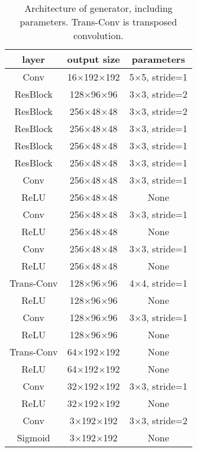 \documentclass{article}
\begin{document}
\begin{table}[h] 
  \centering  
    \begin{tabular}{c|c|c}  
    \hline
    \textbf{layer} & \textbf{output size} & \textbf{parameters}\\ 
    \hline \hline
      Conv & 16$\times$192$\times$192 & 5$\times$5, stride=1 \\
    \hline
      ResBlock & 128$\times$96$\times$96 & 3$\times$3, stride=2 \\
    \hline
      ResBlock & 256$\times$48$\times$48 & 3$\times$3, stride=2 \\
    \hline
      ResBlock & 256$\times$48$\times$48 & 3$\times$3, stride=1 \\
    \hline
      ResBlock & 256$\times$48$\times$48 & 3$\times$3, stride=1 \\
    \hline
      ResBlock & 256$\times$48$\times$48 & 3$\times$3, stride=1 \\
    \hline
      Conv & 256$\times$48$\times$48 & 3$\times$3, stride=1 \\
    \hline
      ReLU & 256$\times$48$\times$48 & None \\
    \hline
      Conv & 256$\times$48$\times$48 & 3$\times$3, stride=1 \\
    \hline
      ReLU & 256$\times$48$\times$48 & None \\
    \hline
      Conv & 256$\times$48$\times$48 & 3$\times$3, stride=1 \\
    \hline
      ReLU & 256$\times$48$\times$48 & None \\
    \hline
      Trans-Conv & 128$\times$96$\times$96 & 4$\times$4, stride=1 \\
    \hline
      ReLU & 128$\times$96$\times$96 & None \\
    \hline
      Conv & 128$\times$96$\times$96 & 3$\times$3, stride=1 \\
    \hline
      ReLU & 128$\times$96$\times$96 & None \\
    \hline
      Trans-Conv & 64$\times$192$\times$192 & None \\
    \hline
      ReLU & 64$\times$192$\times$192 & None \\
    \hline
      Conv & 32$\times$192$\times$192 & 3$\times$3, stride=1 \\
    \hline
      ReLU & 32$\times$192$\times$192 & None \\
    \hline
      Conv & 3$\times$192$\times$192 & 3$\times$3, stride=2 \\
    \hline
      Sigmoid & 3$\times$192$\times$192 & None \\
    \hline
    \end{tabular}
  
  \caption{Architecture of generator, including parameters. Trans-Conv is transposed convolution.} 
  \label{tab:1}
  \label{table1} 
\end{table}
\end{document}
